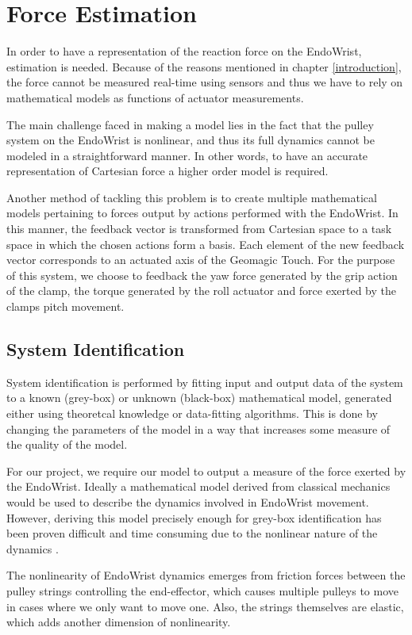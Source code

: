 \chapter{Force Estimation}
In order to have a representation of the reaction force on the EndoWrist, estimation is needed.
Because of the reasons mentioned in chapter \ref{introduction}, the force cannot be measured real-time using sensors and thus we have to rely on mathematical models as functions of actuator measurements.

The main challenge faced in making a model lies in the fact that the pulley system on the EndoWrist is nonlinear, and thus its full dynamics cannot be modeled in a straightforward manner. 
In other words, to have an accurate representation of Cartesian force a higher order model is required.

Another method of tackling this problem is to create multiple mathematical models pertaining to forces output by actions performed with the EndoWrist.
In this manner, the feedback vector is transformed from Cartesian space to a task space in which the chosen actions form a basis.
Each element of the new feedback vector corresponds to an actuated axis of the Geomagic Touch.
For the purpose of this system, we choose to feedback the yaw force generated by the grip action of the clamp, the torque generated by the roll actuator and force exerted by the clamps pitch movement.

\section{System Identification}
System identification is performed by fitting input and output data of the system to a known (grey-box) or unknown (black-box) mathematical model, generated either using theoretcal knowledge or data-fitting algorithms. 
This is done by changing the parameters of the model in a way that increases some measure of the quality of the model.

For our project, we require our model to output a measure of the force exerted by the EndoWrist.
Ideally a mathematical model derived from classical mechanics would be used to describe the dynamics involved in EndoWrist movement.
However, deriving this model precisely enough for grey-box identification has been proven difficult and time consuming due to the nonlinear nature of the dynamics \cite{kim2014dynamic}.

The nonlinearity of EndoWrist dynamics emerges from friction forces between the pulley strings controlling the end-effector, which causes multiple pulleys to move in cases where we only want to move one. 
Also, the strings themselves are elastic, which adds another dimension of nonlinearity.

